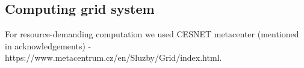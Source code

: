 \subsection*{Computing grid system}
For resource-demanding computation we used CESNET metacenter (mentioned in acknowledgements) - https://www.metacentrum.cz/en/Sluzby/Grid/index.html.






